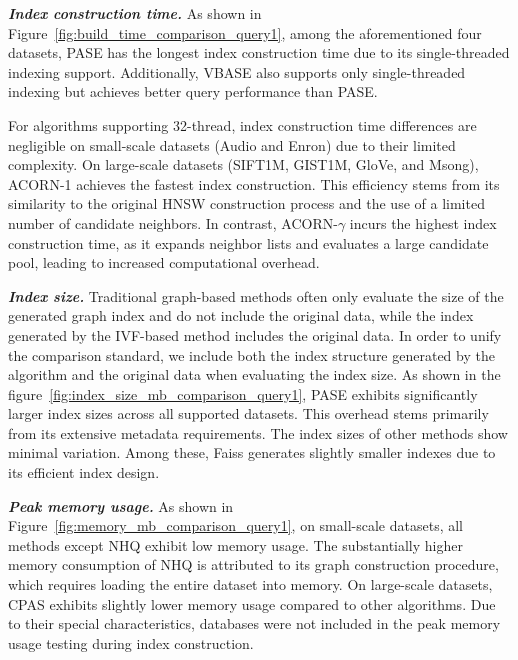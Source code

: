 \documentclass[sigconf, nonacm]{acmart}
\begin{document}
\begin{sloppypar}
\textit{\textbf{Index construction time.}}
As shown in Figure~\ref{fig:build_time_comparison_query1}, among the aforementioned four datasets, PASE has the longest index construction time due to its single-threaded indexing support. Additionally, VBASE also supports only single-threaded indexing but achieves better query performance than PASE.

For algorithms supporting 32-thread, index construction time differences are negligible on small-scale datasets (Audio and Enron) due to their limited complexity. On large-scale datasets (SIFT1M, GIST1M, GloVe, and Msong), ACORN-1 achieves the fastest index construction. This efficiency stems from its similarity to the original HNSW construction process and the use of a limited number of candidate neighbors. In contrast, ACORN-$\gamma$ incurs the highest index construction time, as it expands neighbor lists and evaluates a large candidate pool, leading to increased computational overhead.


\textit{\textbf{Index size.}}
Traditional graph-based methods often only evaluate the size of the generated graph index and do not include the original data, while the index generated by the IVF-based method includes the original data. In order to unify the comparison standard, 
we include both the index structure generated by the algorithm and the original data when evaluating the index size. 
As shown in the figure~\ref{fig:index_size_mb_comparison_query1}, PASE exhibits significantly larger index sizes across all supported datasets. This overhead stems primarily from its extensive metadata requirements. The index sizes of other methods show minimal variation. Among these, Faiss generates slightly smaller indexes due to its efficient index design.



\textit{\textbf{Peak memory usage.}}
As shown in Figure~\ref{fig:memory_mb_comparison_query1}, on small-scale datasets, all methods except NHQ exhibit low memory usage. The substantially higher memory consumption of NHQ is attributed to its graph construction procedure, which requires loading the entire dataset into memory. On large-scale datasets, CPAS exhibits slightly lower memory usage compared to other algorithms. Due to their special characteristics, databases were not included in the peak memory usage testing during index construction.




\end{sloppypar}
\end{document}
